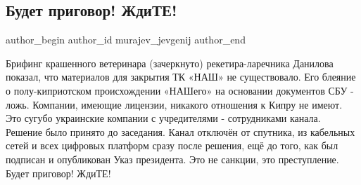  
 
 
 
 
 
\subsection{Будет приговор! ЖдиТЕ!}
\label{sec:11_02_2022.fb.murajev_jevgenij.1.budet_prigovor}
 
\ifcmt
 author_begin
   author_id murajev_jevgenij
 author_end
\fi

Брифинг крашенного ветеринара (зачеркнуто) рекетира-ларечника Данилова показал,
что материалов для закрытия ТК «НАШ» не существовало. Его блеяние о
полу-киприотском происхождении «НАШего» на основании документов СБУ - ложь.
Компании, имеющие лицензии, никакого отношения к Кипру не имеют. Это сугубо
украинские компании с учредителями - сотрудниками канала. Решение было принято
до заседания. Канал отключён от спутника, из кабельных сетей и всех цифровых
платформ сразу после решения, ещё до того, как был подписан и опубликован Указ
президента. Это не санкции, это преступление. Будет приговор! ЖдиТЕ!

